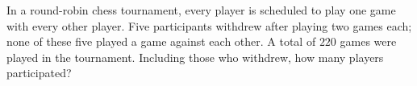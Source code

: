 In a round-robin chess tournament, every player is scheduled to play one game with every other player. Five participants withdrew after playing two games each; none of these five played a game against each other. A total of $220$ games were played in the tournament. Including those who withdrew, how many players participated?
